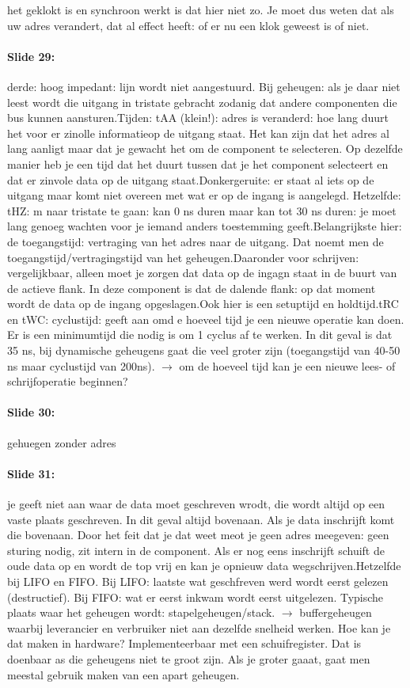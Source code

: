 \documentclass[10pt,a4paper]{book}
\begin{document}
het geklokt is en synchroon werkt is dat hier niet zo. Je moet dus weten dat als uw adres verandert, dat al effect heeft: of er nu een klok geweest is of niet. 

\paragraph{Slide 29:} derde: hoog impedant: lijn wordt niet aangestuurd. Bij geheugen: als je daar niet leest wordt die uitgang in tristate gebracht zodanig dat andere componenten die bus kunnen aansturen.Tijden: tAA (klein!): adres is veranderd: hoe lang duurt het voor er zinolle informatieop de uitgang staat. Het kan zijn dat het adres al lang aanligt maar dat je gewacht het om de component te selecteren. Op dezelfde manier heb je een tijd dat het duurt tussen dat je het component selecteert en dat er zinvole data op de uitgang staat.Donkergeruite: er staat al iets op de uitgang maar komt niet overeen met wat er op de ingang is aangelegd. Hetzelfde: tHZ: m naar tristate te gaan: kan 0 ns duren maar kan tot 30 ns duren: je moet lang genoeg wachten voor je iemand anders toestemming geeft.Belangrijkste hier: de toegangstijd: vertraging van het adres naar de uitgang. Dat noemt men de toegangstijd/vertragingstijd van het geheugen.Daaronder voor schrijven: vergelijkbaar, alleen moet je zorgen dat data op de ingagn staat in de buurt van de actieve flank. In deze component is dat de dalende flank: op dat moment wordt de data op de ingang opgeslagen.Ook hier is een setuptijd en holdtijd.tRC en tWC: cyclustijd: geeft aan omd e hoeveel tijd je een nieuwe operatie kan doen. Er is een minimumtijd die nodig is om 1 cyclus af te werken. In dit geval is dat 35 ns, bij dynamische geheugens gaat die veel groter zijn (toegangstijd van 40-50 ns maar cyclustijd van 200ns). $\rightarrow$ om de hoeveel tijd kan je een nieuwe lees- of schrijfoperatie beginnen?

\paragraph{Slide 30:} gehuegen zonder adres

\paragraph{Slide 31:} je geeft niet aan waar de data moet geschreven wrodt, die wordt altijd op een vaste plaats geschreven. In dit geval altijd bovenaan. Als je data inschrijft komt die bovenaan. Door het feit dat je dat weet meot je geen adres meegeven: geen sturing nodig, zit intern in de component. Als er nog eens inschrijft schuift de oude data op en wordt de top vrij en kan je opnieuw data wegschrijven.Hetzelfde bij LIFO en FIFO. Bij LIFO: laatste wat geschfreven werd wordt eerst gelezen (destructief). Bij FIFO: wat er eerst inkwam wordt eerst uitgelezen. Typische plaats waar het geheugen wordt: stapelgeheugen/stack. $\rightarrow$ buffergeheugen waarbij leverancier en verbruiker niet aan dezelfde snelheid werken.  Hoe kan je dat maken in hardware? Implementeerbaar met een schuifregister. Dat is doenbaar as die geheugens niet te groot zijn. Als je groter gaaat, gaat men meestal gebruik maken van een apart geheugen.
\end{document}
